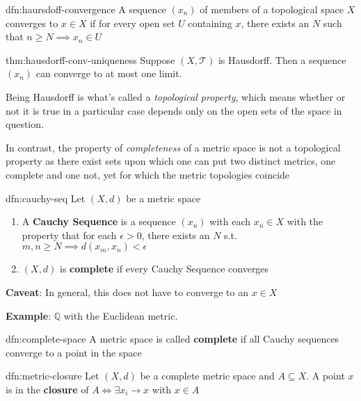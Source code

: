 \documentclass{article}
\begin{document}
\begin{dfn}{dfn:haursdoff-convergence}{}
    A sequence $(x_{n})$ of members of a topological space $X$ converges to $x\in X$ if for every open set $U$ containing $x$, there exists an $N$ such that $n\ge N \implies x_{n}\in U$
\end{dfn}

\begin{thm}{thm:hausdorff-conv-uniqueness}{}
    Suppose $(X, \mathcal{T})$ is Hausdorff. Then a sequence $(x_{n})$ can converge to at most one limit.
\end{thm}

Being Hausdorff is what's called a \textit{topological property}, which means whether or not it is true in a particular case depends only on the open sets of the space in question.

In contrast, the property of \textit{completeness} of a metric space is not a topological property as there exist sets upon which one can put two distinct metrics, one complete and one not, yet for which the metric topologies coincide

\newpage
\begin{dfn}{dfn:cauchy-seq}{}
    Let $(X, d)$ be a metric space
    \begin{enumerate}
        \item A \textbf{Cauchy Sequence} is a sequence $(x_{n})$ with each $x_{n}\in X$ with the property that for each $\epsilon > 0$, there exists an $N$ s.t. $m,n\ge N \implies d(x_{m}, x_{n}) < \epsilon$
        \item $(X, d)$ is \textbf{complete} if every Cauchy Sequence converges
    \end{enumerate}
\end{dfn}

\textbf{Caveat}: In general, this does not have to converge to an $x\in X$

\textbf{Example}: $\mathbb{Q}$ with the Euclidean metric. 

\begin{dfn}{dfn:complete-space}{}
    A metric space is called \textbf{complete} if all Cauchy sequences converge to a point in the space
\end{dfn}

\begin{dfn}{dfn:metric-closure}{}
    Let $(X, d)$ be a complete metric space and $A \subseteq X$. A point $x$ is in the \textbf{closure} of $A \iff \exists x_{i} \to x$ with $x\in A$
\end{dfn}
\end{document}
